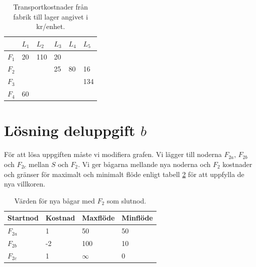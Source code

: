 \documentclass[titlepage, a4paper]{article}
\begin{document}
\begin{table}[h!]
    \centering
    \begin{tabular}{ | l | l | l | l | l | l | }
        \hline
        {} & {$L_{1}$} & {$L_{2}$} & {$L_{3}$} & {$L_{4}$} & {$L_{5}$} \\\hline
        {$F_{1}$} & {20} & {110} & {20} & {} & {} \\\hline
        {$F_{2}$} & {} & {} & {25} & {80} & {16} \\\hline
        {$F_{3}$} & {} & {} & {} & {} & {134} \\\hline
        {$F_{4}$} & {60} & {} & {} & {} & {} \\\hline
    \end{tabular}
    \caption{Transportkostnader från fabrik till lager angivet i kr/enhet.} \label{uppgifta-flode}
\end{table}

\newpage

\section{Lösning deluppgift $b$}

För att lösa uppgiften måste vi modifiera grafen. Vi lägger till noderna $F_{2a}$, $F_{2b}$ och $F_{2c}$ mellan $S$ och $F_{2}$. Vi ger bågarna mellande nya noderna och $F_{2}$ kostnader och gränser för maximalt och minimalt flöde enligt tabell \ref{uppgiftb-bagar} för att uppfylla de nya villkoren.

\begin{table}[h!]
    \centering
    \begin{tabular}{ | l | l | l | l | }
        \hline
        {\textbf{Startnod}} & {\textbf{Kostnad}} & {\textbf{Maxflöde}} & {\textbf{Minflöde}} \\\hline
        {$F_{2a}$} & {1} & {50} & {50} \\\hline
        {$F_{2b}$} & {-2} & {100} & {10} \\\hline
        {$F_{2c}$} & {1} & {$\infty$} & {0} \\\hline
    \end{tabular}
    \caption{Värden för nya bågar med $F_{2}$ som slutnod.} \label{uppgiftb-bagar}
\end{table}
\end{document}

